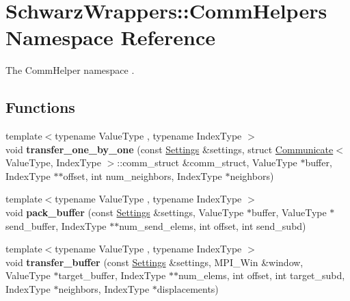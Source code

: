 \hypertarget{namespaceSchwarzWrappers_1_1CommHelpers}{}\section{Schwarz\+Wrappers\+:\+:Comm\+Helpers Namespace Reference}
\label{namespaceSchwarzWrappers_1_1CommHelpers}


The Comm\+Helper namespace .  


\subsection*{Functions}
\begin{DoxyCompactItemize}
\item 
\mbox{\label{namespaceSchwarzWrappers_1_1CommHelpers_aceb69bff99381dac36efe3b97cb63a4d}} 
{\footnotesize template$<$typename Value\+Type , typename Index\+Type $>$ }\\void {\bfseries transfer\+\_\+one\+\_\+by\+\_\+one} (const \hyperlink{structSchwarzWrappers_1_1Settings}{Settings} \&settings, struct \hyperlink{classSchwarzWrappers_1_1Communicate}{Communicate}$<$ Value\+Type, Index\+Type $>$\+::comm\+\_\+struct \&comm\+\_\+struct, Value\+Type $\ast$buffer, Index\+Type $\ast$$\ast$offset, int num\+\_\+neighbors, Index\+Type $\ast$neighbors)
\item 
\mbox{\label{namespaceSchwarzWrappers_1_1CommHelpers_a6febd84c72da5337d90b0b3b79af4926}} 
{\footnotesize template$<$typename Value\+Type , typename Index\+Type $>$ }\\void {\bfseries pack\+\_\+buffer} (const \hyperlink{structSchwarzWrappers_1_1Settings}{Settings} \&settings, Value\+Type $\ast$buffer, Value\+Type $\ast$send\+\_\+buffer, Index\+Type $\ast$$\ast$num\+\_\+send\+\_\+elems, int offset, int send\+\_\+subd)
\item 
\mbox{\label{namespaceSchwarzWrappers_1_1CommHelpers_a50b867eb9c15492cd52b7f6fcff12cc3}} 
{\footnotesize template$<$typename Value\+Type , typename Index\+Type $>$ }\\void {\bfseries transfer\+\_\+buffer} (const \hyperlink{structSchwarzWrappers_1_1Settings}{Settings} \&settings, M\+P\+I\+\_\+\+Win \&window, Value\+Type $\ast$target\+\_\+buffer, Index\+Type $\ast$$\ast$num\+\_\+elems, int offset, int target\+\_\+subd, Index\+Type $\ast$neighbors, Index\+Type $\ast$displacements)
$$
\end{DoxyCompactItemize}
